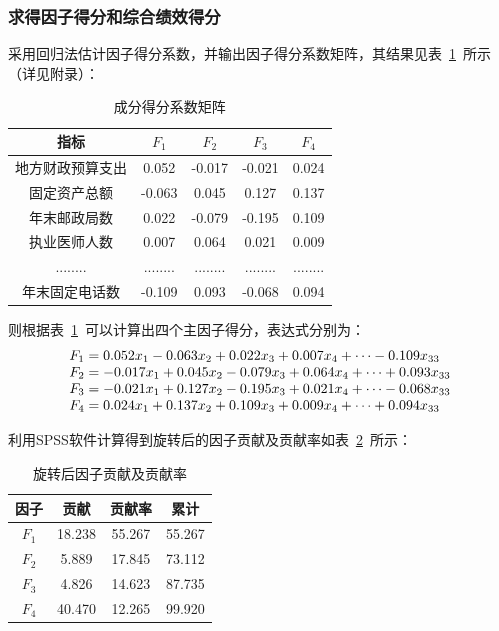 \documentclass{whutmod}
\begin{document}
	\subsubsection{求得因子得分和综合绩效得分}
	采用回归法估计因子得分系数，并输出因子得分系数矩阵，其结果见表~\ref{defenyinzi}~所示（详见附录）：
				\begin{table}[H]
		\centering
		\caption{成分得分系数矩阵}\label{defenyinzi}
		\begin{tabular}{ccccc}
			\toprule[2pt]
			\multicolumn{1}{m{2cm}}{\centering 指标} &
			\multicolumn{1}{m{1cm}}{\centering $F_{1}$} & \multicolumn{1}{m{1cm}}{\centering $F_{2}$} & \multicolumn{1}{m{1cm}}{\centering $F_{3}$}&
			\multicolumn{1}{m{1cm}}{\centering $F_{4}$}\\
			\midrule[1pt]
			地方财政预算支出&0.052 & -0.017 & -0.021&0.024\\ 
			固定资产总额&-0.063 & 0.045 &0.127&0.137\\ 
			年末邮政局数&0.022 &-0.079  &-0.195&0.109\\ 
			执业医师人数&0.007 &0.064 &0.021 &0.009\\ 
			........& ........&  ........ &........ &........ \\ 
			年末固定电话数&-0.109 &0.093 &-0.068 &0.094 \\
			\bottomrule[2pt]
		\end{tabular}
	\end{table}
	则根据表~\ref{defenyinzi}~可以计算出四个主因子得分，表达式分别为：
	\begin{gather}
	\begin{matrix}
	F_{1}=0.052x_{1}-0.063x_{2}+0.022x_{3}+0.007x_{4}+\cdots-0.109x_{33}\hfill\\ 
	F_{2}=-0.017x_{1}+0.045x_{2}-0.079x_{3}+0.064x_{4}+\cdots+0.093x_{33}\hfill\\ 
	F_{3}=-0.021x_{1}+0.127x_{2}-0.195x_{3}+0.021x_{4}+\cdots-0.068x_{33}\hfill\\ 
	F_{4}=0.024x_{1}+0.137x_{2}+0.109x_{3}+0.009x_{4}+\cdots+0.094x_{33}\hfill
	\end{matrix}
	\end{gather}
	
	利用SPSS软件计算得到旋转后的因子贡献及贡献率如表~\ref{fff}~所示：
			\begin{table}[H]
	\centering
	\caption{旋转后因子贡献及贡献率}\label{fff}
	\begin{tabular}{cccc}
		\toprule[2pt]
		\multicolumn{1}{m{2cm}}{\centering 因子}&
		\multicolumn{1}{m{2cm}}{\centering 贡献} & \multicolumn{1}{m{2cm}}{\centering 贡献率} & \multicolumn{1}{m{2cm}}{\centering 累计}\\
		\midrule[1pt]
		$F_{1}$	 &  18.238 & 55.267&55.267\\ 
		$F_{2}$ &  5.889 & 17.845&73.112\\ 
		$F_{3}$	 &  4.826 &14.623&87.735\\ 
		$F_{4}$  &  40.470& 12.265&99.920\\ 
		\bottomrule[2pt]
	\end{tabular}
\end{table}
	
\end{document}
